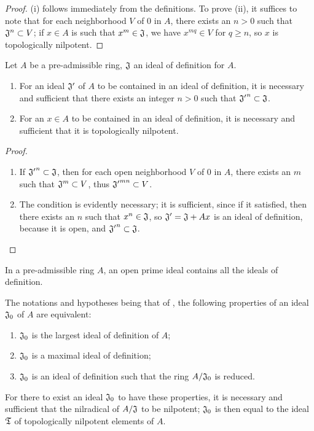 \begin{proof}
\label{proof-0.7.1.3}
(i) follows immediately from the definitions. To prove (ii), it suffices to note that for
each neighborhood $V$ of $0$ in $A$, there exists an $n>0$ such that
$\mathfrak{J}^n\subset V$; if $x\in A$ is such that $x^m\in\mathfrak{J}$, we have
$x^{mq}\in V$ for $q\geqslant n$, so $x$ is topologically nilpotent.
\end{proof}

\begin{prop}[7.1.4]
\label{0.7.1.4}
Let $A$ be a pre-admissible ring, $\mathfrak{J}$ an ideal of definition for $A$.
\begin{enumerate}[label={\rm(\roman*)}]
  \item For an ideal $\mathfrak{J}'$ of $A$ to be contained in an ideal of
    definition, it is necessary and sufficient that there exists an integer
    $n>0$ such that ${\mathfrak{J}'}^n\subset\mathfrak{J}$.
  \item For an $x\in A$ to be contained in an ideal of definition, it is
    necessary and sufficient that it is topologically nilpotent.
\end{enumerate}
\end{prop}

\begin{proof}
\label{proof-0.7.1.4}
\medskip\noindent
\begin{enumerate}[label=(\roman*)]
  \item If ${\mathfrak{J}'}^n\subset\mathfrak{J}$, then for each open neighborhood
    $V$ of $0$ in $A$, there exists an $m$ such that $\mathfrak{J}^m\subset V$, thus
    ${\mathfrak{J}'}^{mn}\subset V$.
  \item The condition is evidently necessary; it is sufficient, since if it
    satisfied, then there exists an $n$ such that $x^n\in\mathfrak{J}$, so
    $\mathfrak{J}'=\mathfrak{J}+Ax$ is an ideal of definition, because it is
    open, and ${\mathfrak{J}'}^n\subset\mathfrak{J}$.
\end{enumerate}
\end{proof}

\begin{cor}[7.1.5]
\label{0.7.1.5}
In a pre-admissible ring $A$, an open prime ideal contains all the ideals of definition.
\end{cor}

\begin{cor}[7.1.6]
\label{0.7.1.6}
The notations and hypotheses being that of , the following
properties of an ideal $\mathfrak{J}_0$ of $A$ are equivalent:
\begin{enumerate}[label={\rm(\alph*)}]
  \item $\mathfrak{J}_0$ is the largest ideal of definition of $A$;
  \item $\mathfrak{J}_0$ is a maximal ideal of definition;
  \item $\mathfrak{J}_0$ is an ideal of definition such that the ring $A/\mathfrak{J}_0$ is reduced.
\end{enumerate}
For there to exist an ideal $\mathfrak{J}_0$ to have these properties, it is
necessary and sufficient that the nilradical of $A/\mathfrak{J}$ to be
nilpotent; $\mathfrak{J}_0$ is then equal to the ideal $\mathfrak{T}$ of
topologically nilpotent elements of $A$.
\end{cor}

